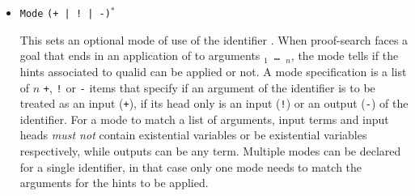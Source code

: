 \begin{coq_example*}
\begin{itemize}
  This command can be used to cut the proof-search tree according to a
  regular expression matching paths to be cut. The grammar for regular
  expressions is the following. Beware, there is no operator precedence
  during parsing, one can check with \texttt{Print HintDb} to verify the
  current cut expression:
\[\begin{array}{lcll}
  e & ::= & \ident & \text{ hint or instance identifier } \\
  & & \texttt{\_} & \text{ any hint } \\
  & & e | e' & \text{ disjunction } \\
  & & e e' & \text{ sequence } \\
  & & e * & \text{ Kleene star } \\
  & & \texttt{emp} & \text{ empty } \\
  & & \texttt{eps} & \text{ epsilon } \\
  & & \texttt{(} e \texttt{)} & 
\end{array}\]

The \texttt{emp} regexp does not match any search path while
\texttt{eps} matches the empty path. During proof search, the path of
successive successful hints on a search branch is recorded, as a list of
identifiers for the hints (note \texttt{Hint Extern}'s do not have an
associated identifier). Before applying any hint $\ident$ the current
path $p$ extended with $\ident$ is matched against the current cut
expression $c$ associated to the hint database. If matching succeeds,
the hint is \emph{not} applied. The semantics of \texttt{Hint Cut} $e$
is to set the cut expression to $c | e$, the initial cut expression
being \texttt{emp}.


\item \texttt{Mode} {\tt (+ | ! | -)}$^*$ {\qualid}
\label{HintMode}

This sets an optional mode of use of the identifier {\qualid}.  When
proof-search faces a goal that ends in an application of {\qualid} to
arguments {\tt \term$_1$ \mbox{\dots} \term$_n$}, the mode tells if the
hints associated to qualid can be applied or not. A mode specification
is a list of $n$ {\tt +}, {\tt !} or {\tt -} items that specify if an
argument of the identifier is to be treated as an input ({\tt +}), if
its head only is an input ({\tt !}) or an output ({\tt -}) of the
identifier. For a mode to match a list of arguments, input terms and
input heads \emph{must not} contain existential variables or be
existential variables respectively, while outputs can be any
term. Multiple modes can be declared for a single identifier, in that
case only one mode needs to match the arguments for the hints to be
applied.


\end{itemize}
\end{coq_example*}
